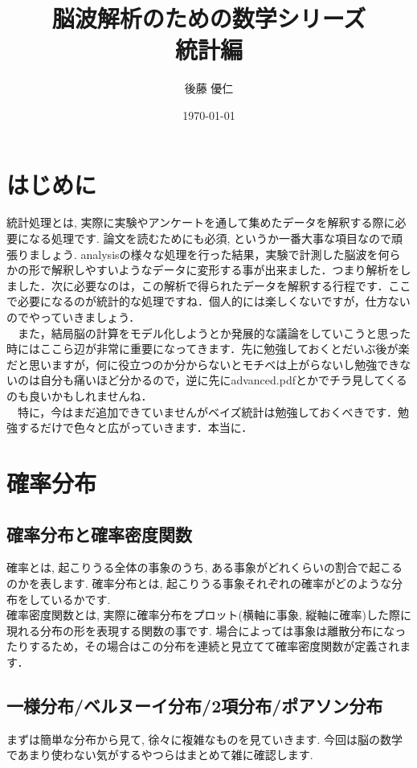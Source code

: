 \documentclass[11pt,a4paper]{jsarticle}                    %
\title{脳波解析のための数学シリーズ\\
統計編}
\author{後藤 優仁}
\date{\today}
\begin{document}
\maketitle

\newpage
%
%
\tableofcontents
\newpage
\section{はじめに}
 統計処理とは, 実際に実験やアンケートを通して集めたデータを解釈する際に必要になる処理です. 論文を読むためにも必須, というか一番大事な項目なので頑張りましょう. analysisの様々な処理を行った結果，実験で計測した脳波を何らかの形で解釈しやすいようなデータに変形する事が出来ました．つまり解析をしました．次に必要なのは，この解析で得られたデータを解釈する行程です．ここで必要になるのが統計的な処理ですね．個人的には楽しくないですが，仕方ないのでやっていきましょう．\\
 　また，結局脳の計算をモデル化しようとか発展的な議論をしていこうと思った時にはここら辺が非常に重要になってきます．先に勉強しておくとだいぶ後が楽だと思いますが，何に役立つのか分からないとモチベは上がらないし勉強できないのは自分も痛いほど分かるので，逆に先にadvanced.pdfとかでチラ見してくるのも良いかもしれませんね．\\
 　特に，今はまだ追加できていませんがベイズ統計は勉強しておくべきです．勉強するだけで色々と広がっていきます．本当に．
 
 \newpage
 
 
\section{確率分布}
\subsection{確率分布と確率密度関数}
確率とは, 起こりうる全体の事象のうち, ある事象がどれくらいの割合で起こるのかを表します. 確率分布とは, 起こりうる事象それぞれの確率がどのような分布をしているかです. \\
確率密度関数とは, 実際に確率分布をプロット(横軸に事象, 縦軸に確率)した際に現れる分布の形を表現する関数の事です. 場合によっては事象は離散分布になったりするため，その場合はこの分布を連続と見立てて確率密度関数が定義されます．\\

\subsection{一様分布/ベルヌーイ分布/2項分布/ポアソン分布}
まずは簡単な分布から見て, 徐々に複雑なものを見ていきます. 今回は脳の数学であまり使わない気がするやつらはまとめて雑に確認します.\\
\end{document}
